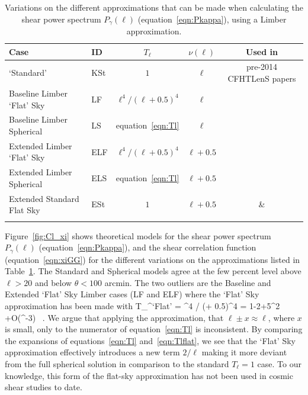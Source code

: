  \begin{table}[htb]
\begin{center}
\begin{tabular}{ | l | l | c | c  | c |}
\hline
Case & ID & $T_\ell$ & $\nu(\ell)$ & Used in \\ \hline
\citet{kitching/etal:2016} `Standard' & KSt & $1$ & $\ell$ & pre-2014 CFHTLenS papers \\
Baseline Limber `Flat' Sky &  LF & $\ell^4 / (\ell + 0.5)^4$ & $\ell$ & \\
Baseline Limber Spherical & LS & equation~\ref{eqn:Tl} & $\ell$ & \\
Extended Limber `Flat' Sky & ELF & $\ell^4 / (\ell + 0.5)^4$ & $\ell + 0.5$ & \\
Extended Limber Spherical & ELS & equation~\ref{eqn:Tl}& $\ell + 0.5$  & \\
Extended Standard Flat Sky & ESt & $1$ & $\ell + 0.5$ & \citet{joudaki/etal:2016} \&  \\
  &  & & & \citet{hildebrandt/etal:2016}\\\hline
 \end{tabular}
 \end{center}
 \caption{\label{tab:Tl_nu}Variations on the different approximations that can be made when calculating the shear power spectrum $P_\gamma(\ell)$ (equation~\ref{eqn:Pkappa}), using a Limber approximation.} 
 \end{table}

Figure~\ref{fig:Cl_xi} shows theoretical models for the shear power spectrum $P_\gamma(\ell)$ (equation~\ref{eqn:Pkappa}), and the shear correlation function (equation~\ref{eqn:xiGG}) for the different variations on the approximations listed in Table~\ref{tab:Tl_nu}.   The Standard and Spherical models agree at the few percent level above $\ell>20$ and below $\theta< 100$ arcmin.  The two outliers are the Baseline and Extended `Flat' Sky Limber cases (LF and ELF) where the \citet{kitching/etal:2016} `Flat' Sky approximation has been made with
\be
T_\ell^{\rm `Flat'} = \ell^4 / (\ell + 0.5)^4 = 1-{2\over \ell}+{5\ell^2} +{\cal O}(\ell^{-3}) \, . 
\label{eqn:Tlflat}
\ee    
We argue that applying the approximation, that $\ell \pm x \approx \ell$, where $x$ is small, only to the numerator of equation~\ref{eqn:Tl} is inconsistent.  By comparing the expansions of equations~\ref{eqn:Tl} and~\ref{eqn:Tlflat}, we see that the \citet{kitching/etal:2016} `Flat' Sky approximation effectively introduces a new term $2/\ell$ making it more deviant from the full spherical solution in comparison to the standard $T_\ell = 1$ case.    To our knowledge, this form of the flat-sky approximation has not been used in cosmic shear studies to date.  

